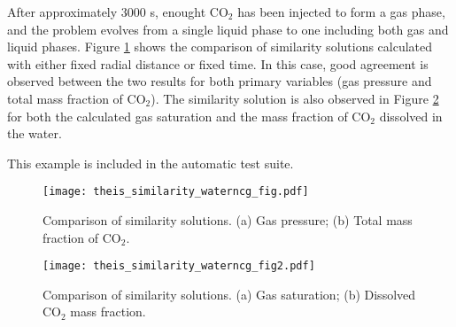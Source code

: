 \documentclass[]{report}
\begin{document}
After approximately 3000 s, enought CO$_2$ has been injected to form a gas phase, and the problem
evolves from a single liquid phase to one including both gas and liquid phases. Figure
\ref{fig:theis_similarity_waterncg_fig} shows the comparison of similarity solutions calculated with
either fixed radial distance or fixed time. In this case, good agreement is observed between the two
results for both primary variables (gas pressure and total mass fraction of CO$_2$). The similarity
solution is also observed in Figure \ref{fig:theis_similarity_waterncg_fig2} for both the calculated
gas saturation and the mass fraction of CO$_2$ dissolved in the water.

This example is included in the automatic test suite.

\begin{figure}[htb]
\centering
\texttt{[image: theis\_similarity\_waterncg\_fig.pdf]}
\caption{Comparison of similarity solutions. (a) Gas pressure; (b) Total mass fraction of CO$_2$.}
\label{fig:theis_similarity_waterncg_fig}
\end{figure}

\begin{figure}[htb]
\centering
\texttt{[image: theis\_similarity\_waterncg\_fig2.pdf]}
\caption{Comparison of similarity solutions. (a) Gas saturation; (b) Dissolved CO$_2$ mass fraction.}
\label{fig:theis_similarity_waterncg_fig2}
\end{figure}
\end{document}
